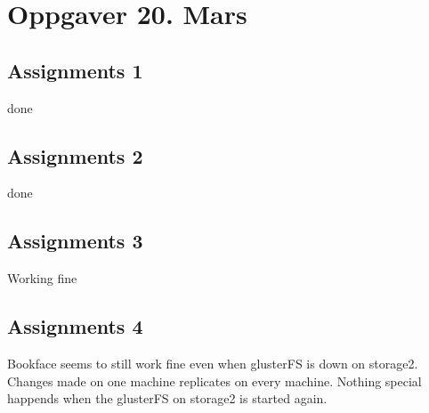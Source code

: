 \section{Oppgaver 20. Mars}

\subsection{Assignments 1} 
done

\subsection{Assignments 2} 
done

\subsection{Assignments 3} 
Working fine

\subsection{Assignments 4} 
Bookface seems to still work fine even when glusterFS is down on storage2. Changes made on one machine replicates on every machine. Nothing special happends when the glusterFS on storage2 is started again.

